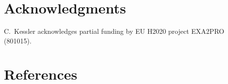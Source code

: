 \documentclass[preprint,12pt]{elsarticle}
\begin{document}
\section*{Acknowledgments}   %

C.\ Kessler acknowledges partial funding by
EU H2020 project EXA2PRO (801015).

\section*{References}
 

\end{document}
